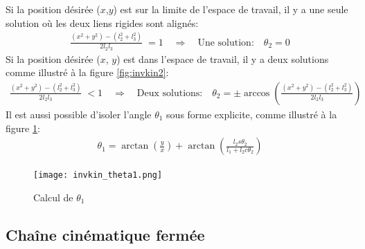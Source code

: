 Si la position désirée ($x$,$y$) est sur la limite de l'espace de travail, il y a une seule solution où les deux liens rigides sont alignés:
\begin{align}
\frac{ (x^2 + y^2) - (l_2^2 + l_3^2) }{2 l_2 l_3} \; = 1 \quad\Rightarrow\quad \text{Une solution:} \quad  \theta_2 = 0
\end{align} 
Si la position désirée ($x$, $y$) est dans l'espace de travail, il y a deux solutions comme illustré à la figure \ref{fig:invkin2}:
\begin{align}
\frac{ (x^2 + y^2) - (l_2^2 + l_3^2) }{2 l_2 l_3} \; < 1 \quad\Rightarrow\quad \text{Deux solutions:} \quad  \theta_2 = \pm \arccos \left(\frac{ (x^2 + y^2) - (l_2^2 + l_3^2) }{2 l_2 l_3}\right)
\end{align} 
Il est aussi possible d'isoler l'angle $\theta_1$ sous forme explicite, comme illustré à la figure \ref{fig:invkin_theta1}:
\begin{align}
\theta_1 = \arctan \left( \frac{y}{x} \right) + \arctan \left( \frac{l_2 s\theta_2}{l_1 + l_2 c\theta_2} \right)
\end{align} 

\begin{figure}[htbp]
	\centering
		\texttt{[image: invkin\_theta1.png]}
	\caption{Calcul de $\theta_1$}
	\label{fig:invkin_theta1}
\end{figure}



\newpage
\subsection{Chaîne cinématique fermée}

